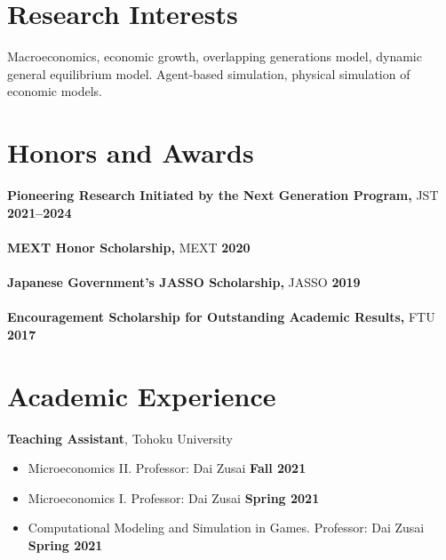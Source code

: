 \documentclass[margin,line]{res}
\begin{document}
\begin{resume}

\section{\sc Research Interests}
	Macroeconomics, economic growth, overlapping generations model, dynamic general equilibrium model. Agent-based simulation, physical simulation of economic models.

\section{\sc Honors and Awards}
{\bf Pioneering Research Initiated by the Next Generation Program,} JST \hfill {\bf 2021--2024}\\
\\
{\bf MEXT Honor Scholarship,} MEXT \hfill {\bf 2020}\\
\\
{\bf Japanese Government's JASSO Scholarship,} JASSO \hfill {\bf 2019}\\
\\
{\bf Encouragement Scholarship for Outstanding Academic Results,} FTU \hfill {\bf 2017}\\

\vspace{-1em}

\section{\sc Academic Experience}
{\bf Teaching Assistant}, Tohoku University
\vspace*{.05in}
\begin{itemize}
\item[ ] Microeconomics II. Professor: Dai Zusai \hfill {\bf Fall 2021}
\item[ ] Microeconomics I. Professor: Dai Zusai \hfill {\bf Spring 2021}
\item[ ] Computational Modeling and Simulation in Games. Professor: Dai Zusai \hfill {\bf Spring 2021}
\end{itemize}


\end{resume}
\end{document}
